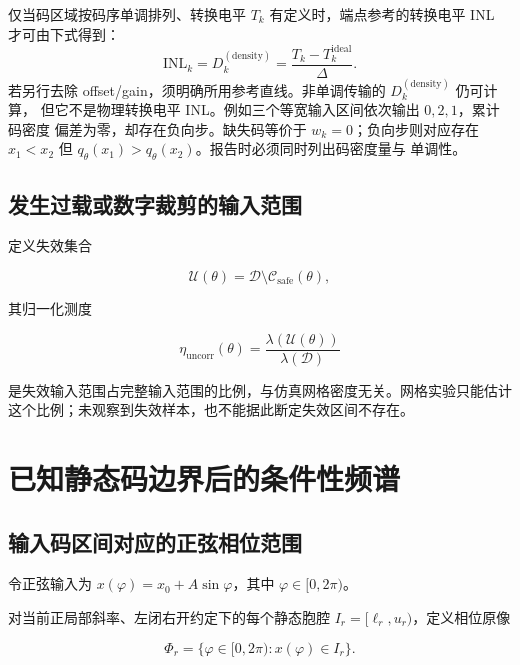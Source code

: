 \documentclass[11pt,a4paper]{ctexart}
\theoremstyle{adcplain}
\theoremstyle{definition}
\begin{document}
仅当码区域按码序单调排列、转换电平 $T_k$ 有定义时，端点参考的转换电平 INL
才可由下式得到：
\begin{equation}
  \mathrm{INL}_k=D_k^{(\mathrm{density})}
  =\frac{T_k-T_k^{\mathrm{ideal}}}{\Delta}.
  \label{eq:inl}
\end{equation}
若另行去除 offset/gain，须明确所用参考直线。非单调传输的
$D_k^{(\mathrm{density})}$ 仍可计算，
但它不是物理转换电平 INL。例如三个等宽输入区间依次输出 $0,2,1$，累计码密度
偏差为零，却存在负向步。缺失码等价于 $w_k=0$；负向步则对应存在
$x_1<x_2$ 但 $q_\theta(x_1)>q_\theta(x_2)$。报告时必须同时列出码密度量与
单调性。

\subsection{发生过载或数字裁剪的输入范围}

定义失效集合

\begin{equation}
  \mathcal U(\theta)
  =
  \mathcal D\setminus\mathcal C_{\mathrm{safe}}(\theta),
\end{equation}

其归一化测度

\begin{equation}
  \eta_{\mathrm{uncorr}}(\theta)
  =
  \frac{\lambda(\mathcal U(\theta))}
       {\lambda(\mathcal D)}
  \label{eq:uncorrectable-measure}
\end{equation}

是失效输入范围占完整输入范围的比例，与仿真网格密度无关。网格实验只能估计
这个比例；未观察到失效样本，也不能据此断定失效区间不存在。

\section{已知静态码边界后的条件性频谱}

\subsection{输入码区间对应的正弦相位范围}

令正弦输入为 $x(\varphi)=x_0+A\sin\varphi$，其中 $\varphi\in[0,2\pi)$。

对当前正局部斜率、左闭右开约定下的每个静态胞腔
$I_r=[\ell_r,u_r)$，定义相位原像

\begin{equation}
  \Phi_r
  =
  \{\varphi\in[0,2\pi):x(\varphi)\in I_r\}.
  \label{eq:phase-preimage}
\end{equation}
\end{document}

